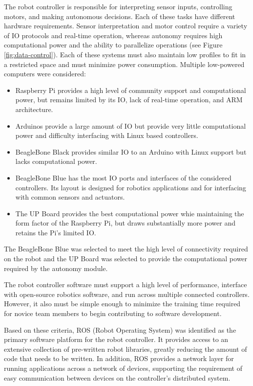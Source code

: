 \documentclass[class=article, crop=false]{standalone}
\begin{document}
	The robot controller is responsible for interpreting sensor inputs, controlling motors, and making autonomous decisions. Each of these tasks have  different hardware requirements. Sensor interpretation and motor control require a variety of IO protocols and real-time operation, whereas autonomy requires high computational power and the ability to parallelize operations (see Figure \ref{fig:data-control}). Each of these systems must also maintain low profiles to fit in a restricted space and must minimize power consumption. Multiple low-powered computers were considered:
	\begin{itemize}
	 \item Raspberry Pi provides a high level of community support and computational power, but remains limited by its IO, lack of real-time operation, and ARM architecture.
	 \item Arduinos provide a large amount of IO but provide very little computational power and difficulty interfacing with Linux based controllers.
	 \item BeagleBone Black provides similar IO to an Arduino with Linux support but lacks computational power.
	 \item BeagleBone Blue has the most IO ports and interfaces of the considered controllers. Its layout is designed for robotics applications and for interfacing with common sensors and actuators. 
	 \item The UP Board provides the best computational power whie maintaining the form factor of the Raspberry Pi, but draws substantially more power and retains the Pi’s limited IO.
	\end{itemize}
	
	The BeagleBone Blue was selected to meet the high level of connectivity required on the robot and the UP Board was selected to provide the computational power required by the autonomy module.
	
	The robot controller software must support a high level of performance, interface with open-source robotics software, and run across multiple connected controllers. However, it also must be simple enough to minimize the training time required for novice team members to begin contributing to software development.
	
	Based on these criteria, ROS (Robot Operating System) was identified as the primary software platform for the robot controller. It provides access to an extensive collection of pre-written robot libraries, greatly reducing the amount of code that needs to be written. In addition, ROS provides a network layer for running applications across a network of devices, supporting the requirement of easy communication between devices on the controller’s distributed system. 
	
\end{document}
